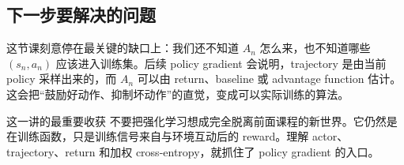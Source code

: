 \documentclass[a4paper]{article}
\begin{document}
\subsection{下一步要解决的问题}

这节课刻意停在最关键的缺口上：我们还不知道 $A_n$ 怎么来，也不知道哪些 $(s_n,a_n)$ 应该进入训练集。后续 policy gradient 会说明，trajectory 是由当前 policy 采样出来的，而 $A_n$ 可以由 return、baseline 或 advantage function 估计。这会把“鼓励好动作、抑制坏动作”的直觉，变成可以实际训练的算法。

\begin{importantbox}{这一讲的最重要收获}
    不要把强化学习想成完全脱离前面课程的新世界。它仍然是在训练函数，只是训练信号来自与环境互动后的 reward。理解 actor、trajectory、return 和加权 cross-entropy，就抓住了 policy gradient 的入口。
\end{importantbox}
\end{document}
